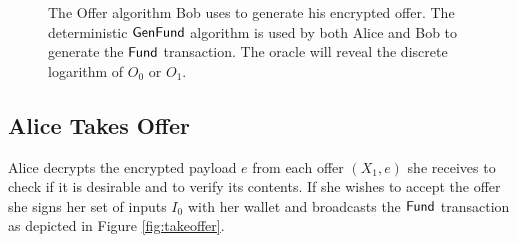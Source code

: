 \documentclass[runningheads]{llncs}
\begin{document}
\begin{figure}[!h]
  \centering
 \caption{The \textsf{Offer} algorithm Bob uses to generate his encrypted offer. The deterministic $\textsf{GenFund}$ algorithm is used by both Alice and Bob to generate the $\textsf{Fund}$ transaction. The oracle will reveal the discrete logarithm of $O_0$ or $O_1$.}
 \label{fig:offer-alg}
\end{figure}

\subsection{Alice Takes Offer}

Alice decrypts the encrypted payload $e$ from each offer $(X_1, e)$ she receives to check if it is desirable and to verify its contents. If she wishes to accept the offer she signs her set of inputs $I_0$ with her wallet and broadcasts the $\textsf{Fund}$ transaction as depicted in Figure \ref{fig:takeoffer}.
\end{document}
